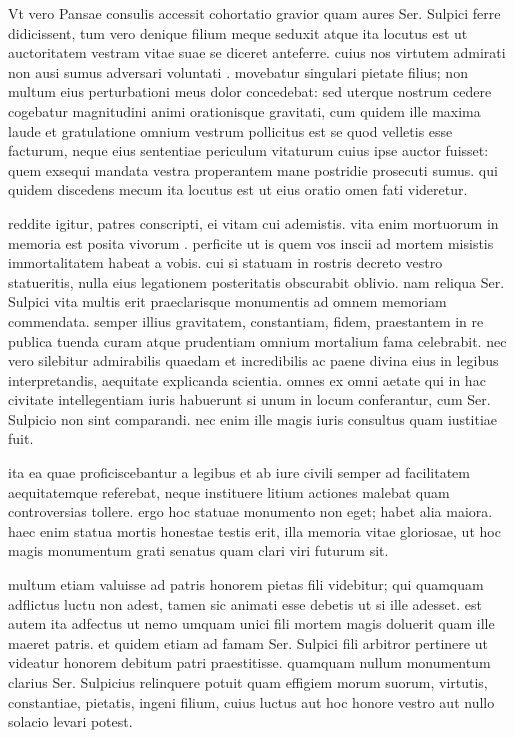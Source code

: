  Vt vero Pansae consulis accessit cohortatio gravior quam aures Ser. Sulpici ferre didicissent, tum vero denique filium meque seduxit atque ita locutus est ut auctoritatem vestram vitae suae se diceret anteferre. cuius nos virtutem admirati non ausi sumus adversari voluntati . movebatur singulari pietate filius; non multum eius perturbationi meus dolor concedebat: sed uterque nostrum cedere cogebatur magnitudini animi orationisque gravitati, cum quidem ille maxima laude et gratulatione omnium vestrum pollicitus est se quod velletis esse facturum, neque eius sententiae periculum vitaturum cuius ipse auctor fuisset: quem exsequi mandata vestra properantem mane postridie prosecuti sumus. qui quidem discedens mecum ita locutus est ut eius oratio omen fati videretur.

 reddite igitur, patres conscripti, ei vitam cui ademistis. vita enim mortuorum in memoria est posita vivorum . perficite ut is quem vos inscii ad mortem misistis immortalitatem habeat a vobis. cui si statuam in rostris decreto vestro statueritis, nulla eius legationem posteritatis obscurabit oblivio. nam reliqua Ser. Sulpici vita multis erit praeclarisque monumentis ad omnem memoriam commendata. semper illius gravitatem, constantiam, fidem, praestantem in re publica tuenda curam atque prudentiam omnium mortalium fama celebrabit. nec vero silebitur admirabilis quaedam et incredibilis ac paene divina eius in legibus interpretandis, aequitate explicanda scientia. omnes ex omni aetate qui in hac civitate intellegentiam iuris habuerunt si unum in locum conferantur, cum Ser. Sulpicio non sint comparandi. nec enim ille magis iuris consultus quam iustitiae fuit.

 ita ea quae proficiscebantur a legibus et ab iure civili semper ad facilitatem aequitatemque referebat, neque instituere litium actiones malebat quam controversias tollere. ergo hoc statuae monumento non eget; habet alia maiora. haec enim statua mortis honestae testis erit, illa memoria vitae gloriosae, ut hoc magis monumentum grati senatus quam clari viri futurum sit.

 multum etiam valuisse ad patris honorem pietas fili videbitur; qui quamquam adflictus luctu non adest, tamen sic animati esse debetis ut si ille adesset. est autem ita adfectus ut nemo umquam unici fili mortem magis doluerit quam ille maeret patris. et quidem etiam ad famam Ser. Sulpici fili arbitror pertinere ut videatur honorem debitum patri praestitisse. quamquam nullum monumentum clarius Ser. Sulpicius relinquere potuit quam effigiem morum suorum, virtutis, constantiae, pietatis, ingeni filium, cuius luctus aut hoc honore vestro aut nullo solacio levari potest.

